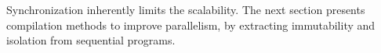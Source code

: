 Synchronization inherently limits the scalability.
The next section presents compilation methods to improve parallelism, by extracting immutability and isolation from sequential programs.









